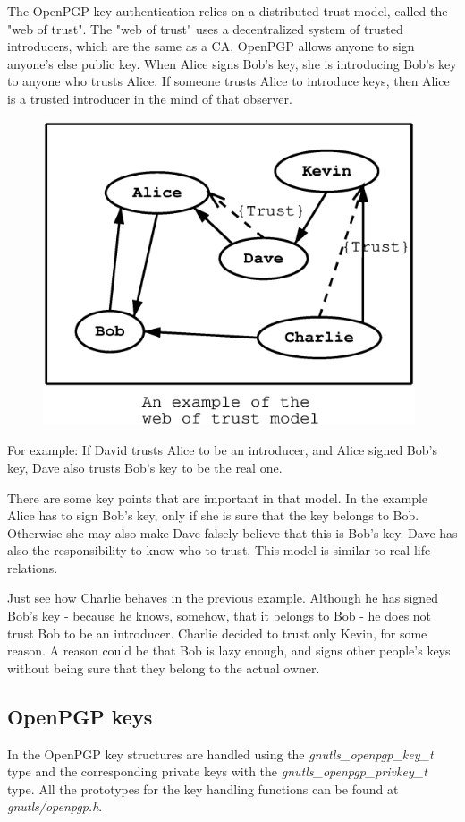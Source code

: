 The OpenPGP key authentication relies on a distributed trust model, called
the "web of trust". The "web of trust" uses a decentralized system of 
trusted introducers, which are the same as a CA. OpenPGP allows anyone to 
sign anyone's else public key. When Alice signs Bob's key, she is introducing 
Bob's key to anyone who trusts Alice. If someone trusts Alice to introduce
keys, then Alice is a trusted introducer in the mind of that observer.

\begin{figure}[hbtp]
\includegraphics[height=9cm,width=11cm]{pgp-fig1}
\label{fig:pgp1}
\end{figure}

For example: If David trusts Alice to be an introducer, and Alice signed
Bob's key, Dave also trusts Bob's key to be the real one.

There are some key points that are important in that model. In the example
Alice has to sign Bob's key, only if she is sure that the key belongs
to Bob. Otherwise she may also make Dave falsely believe that this
is Bob's key. Dave has also the responsibility to know who to trust.
This model is similar to real life relations.

Just see how Charlie behaves in the previous example. Although he has 
signed Bob's key - because he knows, somehow, that it belongs to Bob - 
he does not trust Bob to be an introducer. Charlie decided to trust only 
Kevin, for some reason. A reason could be that Bob is lazy enough, and 
signs other people's keys without being sure that they belong to the 
actual owner.

\subsection*{OpenPGP keys}
In \gnutls{} the OpenPGP key structures \cite{RFC2440} are handled using the
\emph{gnutls\_openpgp\_key\_t} type and the corresponding private keys with
the \emph{gnutls\_openpgp\_privkey\_t} type. All the prototypes for the key handling
functions can be found at \emph{gnutls/openpgp.h}.

